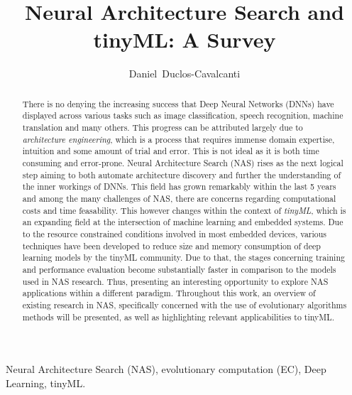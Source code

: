 \documentclass[10pt,        %
               a4paper,     %
               journal,     %
               ]{IEEEtran}
\makeatletter
\def\markboth#1#2{\def\leftmark{\@IEEEcompsoconly{\sffamily}\MakeUppercase{\protect#1}}%
\def\rightmark{\@IEEEcompsoconly{\sffamily}\MakeUppercase{\protect#2}}}
\makeatother
\begin{document}
\title{Neural Architecture Search and tinyML: A Survey}
\author{Daniel~Duclos-Cavalcanti}

\markboth{Seminar for VLSI Entwurfsverfahren, Summer Term 2022}%
{Daniel Duclos-Cavalcanti: Network Architecture Search (NAS)}

\maketitle


\begin{abstract}
There is no denying the increasing success that Deep Neural Networks (DNNs)
have displayed across various tasks such as image classification, speech recognition, machine translation
and many others. This progress can be attributed largely due to \textit{architecture engineering},
which is a process that requires immense domain expertise, intuition and some amount of trial
and error. This is not ideal as it is both time consuming and error-prone. Neural Architecture Search (NAS)
rises as the next logical step aiming to both automate architecture discovery and further the understanding
of the inner workings of DNNs. This field has grown remarkably within the last 5 years and among the many challenges
of NAS, there are concerns regarding computational costs and time feasability. This however changes within the context
of \textit{tinyML}, which is an expanding field at the intersection of machine learning and embedded systems.
Due to the resource constrained conditions involved in most embedded devices, various techniques have been developed
to reduce size and memory consumption of deep learning models by the tinyML community. Due to that,
the stages concerning training and performance evaluation become substantially faster in comparison to
the models used in NAS research. Thus, presenting an interesting opportunity to explore NAS applications
within a different paradigm. Throughout this work, an overview of existing research in NAS, specifically concerned
with the use of evolutionary algorithms methods will be presented, as well as highlighting relevant applicabilities to tinyML.

\end{abstract}

\begin{IEEEkeywords}
Neural Architecture Search (NAS), evolutionary computation (EC), Deep Learning, tinyML.
\end{IEEEkeywords}
\end{document}
